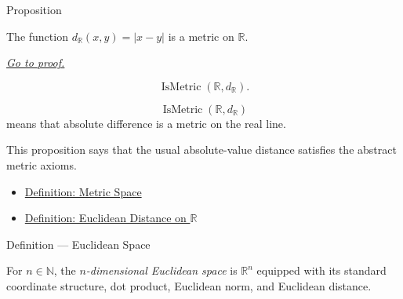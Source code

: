 
\DefinitionalRoot

\begin{propositionbox}{Proposition}
\begin{proposition}
\label{prop:real-line-euclidean-distance-metric}
The function \(d_{\mathbb{R}}(x,y)=|x-y|\) is a metric on \(\mathbb{R}\).

\smallskip
\noindent
\hyperref[prf:real-line-euclidean-distance-metric]{\textit{Go to proof.}}
\end{proposition}
\end{propositionbox}

\begin{remark*}
\[
  \operatorname{IsMetric}(\mathbb{R},d_{\mathbb{R}}).
\]
\end{remark*}

\begin{remark*}
\[
\operatorname{IsMetric}(\mathbb{R},d_{\mathbb{R}})
\]
means that absolute difference is a metric on the real line.
\end{remark*}

\begin{remark*}[Interpretation]
This proposition says that the usual absolute-value distance satisfies the
abstract metric axioms.
\end{remark*}


\begin{dependencies}
\begin{itemize}
  \item \hyperref[def:metric-space]{Definition: Metric Space}
  \item \hyperref[def:real-line-euclidean-distance]{Definition: Euclidean Distance on \(\mathbb{R}\)}
\end{itemize}
\end{dependencies}

\begin{definitionbox}{Definition --- Euclidean Space}
\begin{definition}\label{def:euclidean-space}
For \(n\in\mathbb{N}\), the \emph{\(n\)-dimensional Euclidean space} is
\(\mathbb{R}^n\) equipped with its standard coordinate structure, dot product,
Euclidean norm, and Euclidean distance.
\end{definition}
\end{definitionbox}

